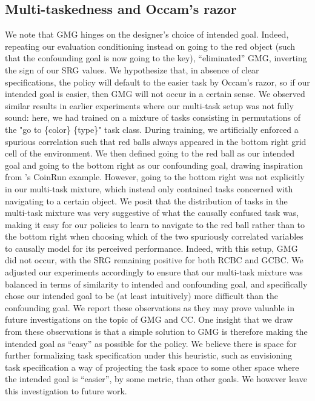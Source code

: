 \documentclass[../main.tex]{subfiles}
\begin{document}
\subsection{Multi-taskedness and Occam's razor}

We note that GMG hinges on the designer's choice of intended goal. Indeed, repeating our evaluation
conditioning instead on going to the red object (such that the confounding goal is now going to the
key), ``eliminated'' GMG, inverting the sign of our SRG values. We hypothesize that, in absence of
clear specifications, the policy will default to the easier task by Occam's razor, so if our
intended goal is easier, then GMG will not occur in a certain sense. We observed similar results in
earlier experiments where our multi-task setup was not fully sound: here, we had trained on
a mixture of tasks consisting in permutations of the "go to \{color\} \{type\}" task class. During
training, we artificially enforced a spurious correlation such that red balls always appeared in the
bottom right grid cell of the environment. We then defined going to the red ball as our intended
goal and going to the bottom right as our confounding goal, drawing inspiration from
\citet{langosco_goal_2022}'s CoinRun example. However, going to the bottom right was not explicitly
in our multi-task mixture, which instead only contained tasks concerned with navigating to a certain
object. We posit that the distribution of tasks in the multi-task mixture was very suggestive of
what the causally confused task was, making it easy for our policies to learn to navigate to the red
ball rather than to the bottom right when choosing which of the two spuriously correlated variables
to causally model for its perceived performance. Indeed, with this setup, GMG did not occur, with
the SRG remaining positive for both RCBC and GCBC. We adjusted our experiments accordingly to ensure
that our multi-task mixture was balanced in terms of similarity to intended and confounding goal,
and specifically chose our intended goal to be (at least intuitively) more difficult than the
confounding goal. We report these observations as they may prove valuable in future investigations
on the topic of GMG and CC. One insight that we draw from these observations is that a simple
solution to GMG is therefore making the intended goal as ``easy'' as possible for the policy. We
believe there is space for further formalizing task specification under this heuristic, such as
envisioning task specification a way of projecting the task space to some other space where the
intended goal is ``easier'', by some metric, than other goals. We however leave this investigation
to future work.
\end{document}
